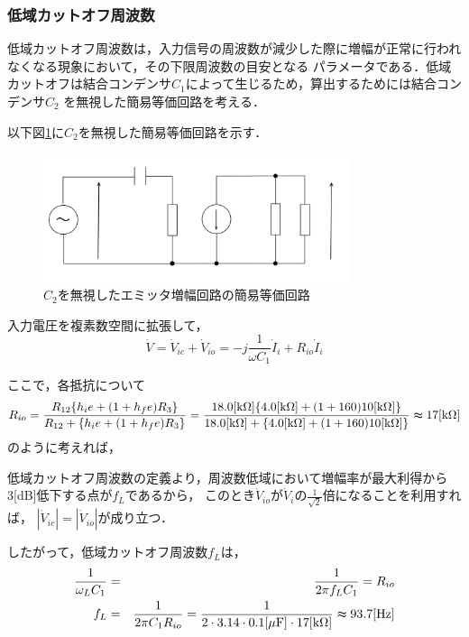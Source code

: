 \documentclass[dvipdfmx,titlepage,a4j]{jsarticle}  %
\numberwithin{equation}{section}
\begin{document}
\subsubsection{低域カットオフ周波数}
低域カットオフ周波数は，入力信号の周波数が減少した際に増幅が正常に行われなくなる現象において，その下限周波数の目安となる
パラメータである．低域カットオフは結合コンデンサ$C_1$によって生じるため，算出するためには結合コンデンサ$C_2$
を無視した簡易等価回路を考える．

以下図\ref{fig:fig4-c2.jpg}に$C_2$を無視した簡易等価回路を示す．
\begin{figure}[H]
  \centering
  \includegraphics[width=9cm]{../fig/fig4-c2.jpg}
  \caption{$C_2$を無視したエミッタ増幅回路の簡易等価回路}
  \label{fig:fig4-c2.jpg}
\end{figure}

入力電圧を複素数空間に拡張して，
\begin{equation}
  \dot{V} = \dot{V}_{ic} + \dot{V}_{io} = -j \frac{1}{\omega C_1} \dot{I}_i + R_{io} \dot{I}_i
\end{equation}

ここで，各抵抗について
\begin{equation}
  R_{io} = \frac{R_{12} \{h_ie + ( 1 + h_fe)R_3\}}{R_{12} + \{h_ie + ( 1 + h_fe)R_3\}} = \frac{18.0\mathrm{[k\Omega]} \{4.0 \mathrm{[k \Omega]} + ( 1 + 160) 10 \mathrm{[k \Omega]}\}}{18.0\mathrm{[k\Omega]} + \{4.0 \mathrm{[k \Omega]} + ( 1 + 160)10 \mathrm{[k \Omega]}\}} \thickapprox 17 \mathrm{[k \Omega]}
\end{equation}
のように考えれば，

低域カットオフ周波数の定義より，周波数低域において増幅率が最大利得から3[dB]低下する点が$f_L$であるから，
このとき$\dot{V}_{io}$が$\dot{V}_{i}$の$\frac{1}{\sqrt{2}}$倍になることを利用すれば，
$\left\lvert \dot{V}_{ic} \right\rvert = \left\lvert \dot{V}_{io} \right\rvert$が成り立つ．

したがって，低域カットオフ周波数$f_L$は，
\begin{eqnarray}
  \frac{1}{\omega_L C_1} &=& \frac{1}{2 \pi f_L C_1} = R_{io} \\
  f_L &=& \frac{1}{2 \pi C_1 R_{io}} =  \frac{1}{2 \cdot 3.14 \cdot 0.1\mathrm{[\mu F]} \cdot 17 \mathrm{[k \Omega]}} \thickapprox 93.7\mathrm{[Hz]}
\end{eqnarray}
\end{document}
